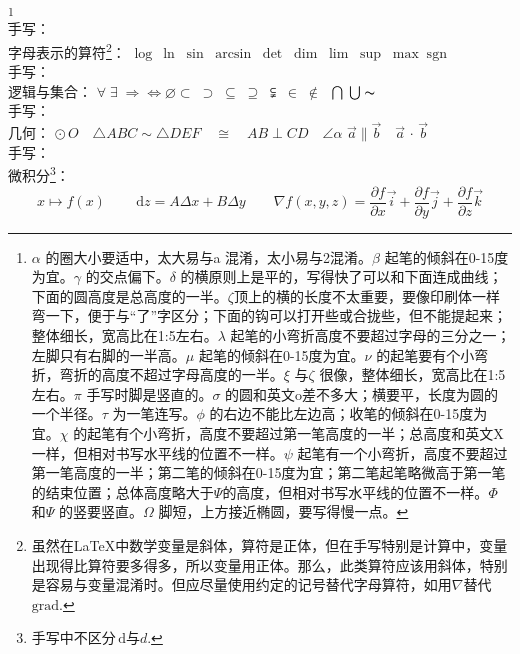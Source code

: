 \documentclass[11pt, a4paper, titlepage]{article}
\newcommand{\diff}{\,\mathrm{d}} %
\begin{document}
\begin{enumerate}
    \footnote{$\alpha$ 的圈大小要适中，太大易与a 混淆，太小易与2混淆。$\beta$ 起笔的倾斜在0-15度为宜。$\gamma$ 的交点偏下。$\delta$ 的横原则上是平的，写得快了可以和下面连成曲线；下面的圆高度是总高度的一半。$\zeta$顶上的横的长度不太重要，要像印刷体一样弯一下，便于与“了”字区分；下面的钩可以打开些或合拢些，但不能提起来；整体细长，宽高比在1:5左右。$\lambda$ 起笔的小弯折高度不要超过字母的三分之一；左脚只有右脚的一半高。$\mu$ 起笔的倾斜在0-15度为宜。$\nu$ 的起笔要有个小弯折，弯折的高度不超过字母高度的一半。$\xi$ 与$\zeta$ 很像，整体细长，宽高比在1:5左右。$\pi$ 手写时脚是竖直的。$\sigma$ 的圆和英文o差不多大；横要平，长度为圆的一个半径。$\tau$ 为一笔连写。$\phi$ 的右边不能比左边高；收笔的倾斜在0-15度为宜。$\chi$ 的起笔有个小弯折，高度不要超过第一笔高度的一半；总高度和英文X一样，但相对书写水平线的位置不一样。$\psi$ 起笔有一个小弯折，高度不要超过第一笔高度的一半；第二笔的倾斜在0-15度为宜；第二笔起笔略微高于第一笔的结束位置；总体高度略大于$\Psi$的高度，但相对书写水平线的位置不一样。$\Phi$ 和$\Psi$ 的竖要竖直。$\Omega$ 脚短，上方接近椭圆，要写得慢一点。}\\
    手写：\\[7pt]
    字母表示的算符\footnote{虽然在\LaTeX 中数学变量是斜体，算符是正体，但在手写特别是计算中，变量出现得比算符要多得多，所以变量用正体。那么，此类算符应该用斜体，特别是容易与变量混淆时。但应尽量使用约定的记号替代字母算符，如用$\nabla$替代$\mathrm{grad}$.}：
    {\fontsize{13pt}{1}
    $\log\: \ln\; \sin\; \arcsin\; \det\; \dim\; \lim\; \sup\; \max\; \mathrm{sgn}$\\}
    手写：\\[7pt]
    逻辑与集合：
    {\fontsize{13pt}{1}
    $\forall \; \exists \; \Rightarrow \iff \varnothing \subset \; \supset \; \subseteq \; \supseteq \; \subsetneqq \; \in \; \notin \;$} $\bigcap \; \bigcup \thicksim$\\%
    手写：\\[7pt]
    几何：
    {\fontsize{10pt}{1}
    $\odot\,O \quad \triangle ABC\!\sim\!\triangle DEF \quad \cong \quad AB\!\perp CD\!\quad \angle\alpha$} \quad $\vec{a}\parallel\vec{b} \quad \vec{a}\,\cdot\,\vec{b}$ \\
    手写：\\[7pt]
    微积分\footnote{手写中不区分$\diff$与$d$.}：
    \begin{displaymath}
        x \mapsto f(x) \qquad \diff z = A\Delta x + B\Delta y \qquad
        \nabla f(x, y, z) = \frac{\partial f}{\partial x}\vec{i} + \frac{\partial f}{\partial y}\vec{j} + \frac{\partial f}{\partial z}\vec{k}

\end{displaymath}
\end{enumerate}
\end{document}
